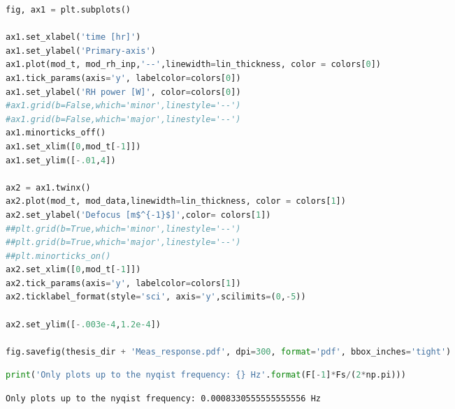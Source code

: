 \begin{spacing}{1} \begin{lstlisting}[language=Python]
fig, ax1 = plt.subplots() 

ax1.set_xlabel('time [hr]') 
ax1.set_ylabel('Primary-axis') 
ax1.plot(mod_t, mod_rh_inp,'--',linewidth=lin_thickness, color = colors[0]) 
ax1.tick_params(axis='y', labelcolor=colors[0])
ax1.set_ylabel('RH power [W]', color=colors[0])
#ax1.grid(b=False,which='minor',linestyle='--')
#ax1.grid(b=False,which='major',linestyle='--')
ax1.minorticks_off()
ax1.set_xlim([0,mod_t[-1]])
ax1.set_ylim([-.01,4])

ax2 = ax1.twinx() 
ax2.plot(mod_t, mod_data,linewidth=lin_thickness, color = colors[1])
ax2.set_ylabel('Defocus [m$^{-1}$]',color= colors[1])
##plt.grid(b=True,which='minor',linestyle='--')
##plt.grid(b=True,which='major',linestyle='--')
##plt.minorticks_on()
ax2.set_xlim([0,mod_t[-1]])
ax2.tick_params(axis='y', labelcolor=colors[1])
ax2.ticklabel_format(style='sci', axis='y',scilimits=(0,-5))

ax2.set_ylim([-.003e-4,1.2e-4])

fig.savefig(thesis_dir + 'Meas_response.pdf', dpi=300, format='pdf', bbox_inches='tight')
\end{lstlisting} \end{spacing}


\begin{spacing}{1} \begin{lstlisting}[language=Python]
print('Only plots up to the nyqist frequency: {} Hz'.format(F[-1]*Fs/(2*np.pi)))
\end{lstlisting} \end{spacing}

\begin{spacing}{1} \begin{lstlisting}
Only plots up to the nyqist frequency: 0.0008330555555555556 Hz
\end{lstlisting} \end{spacing}

